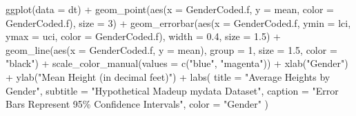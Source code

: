 \documentclass[
  letterpaper,
  DIV=11,
  numbers=noendperiod]{scrartcl}
\newenvironment{Shaded}{\begin{snugshade}}{\end{snugshade}}
\newcommand{\AttributeTok}[1]{\textcolor[rgb]{0.40,0.45,0.13}{#1}}
\newcommand{\DecValTok}[1]{\textcolor[rgb]{0.68,0.00,0.00}{#1}}
\newcommand{\FloatTok}[1]{\textcolor[rgb]{0.68,0.00,0.00}{#1}}
\newcommand{\FunctionTok}[1]{\textcolor[rgb]{0.28,0.35,0.67}{#1}}
\newcommand{\NormalTok}[1]{\textcolor[rgb]{0.00,0.23,0.31}{#1}}
\newcommand{\SpecialCharTok}[1]{\textcolor[rgb]{0.37,0.37,0.37}{#1}}
\newcommand{\StringTok}[1]{\textcolor[rgb]{0.13,0.47,0.30}{#1}}
\begin{document}
\begin{Shaded}
\begin{Highlighting}[]
\FunctionTok{ggplot}\NormalTok{(}\AttributeTok{data =}\NormalTok{ dt) }\SpecialCharTok{+}
  \FunctionTok{geom\_point}\NormalTok{(}\FunctionTok{aes}\NormalTok{(}\AttributeTok{x =}\NormalTok{ GenderCoded.f, }
                 \AttributeTok{y =}\NormalTok{ mean,}
                 \AttributeTok{color =}\NormalTok{ GenderCoded.f),}
             \AttributeTok{size =} \DecValTok{3}\NormalTok{) }\SpecialCharTok{+} 
  \FunctionTok{geom\_errorbar}\NormalTok{(}\FunctionTok{aes}\NormalTok{(}\AttributeTok{x =}\NormalTok{ GenderCoded.f, }
                    \AttributeTok{ymin =}\NormalTok{ lci, }
                    \AttributeTok{ymax =}\NormalTok{ uci,}
                    \AttributeTok{color =}\NormalTok{ GenderCoded.f), }
                \AttributeTok{width =} \FloatTok{0.4}\NormalTok{, }
                \AttributeTok{size =} \FloatTok{1.5}\NormalTok{) }\SpecialCharTok{+}
  \FunctionTok{geom\_line}\NormalTok{(}\FunctionTok{aes}\NormalTok{(}\AttributeTok{x =}\NormalTok{ GenderCoded.f, }
                \AttributeTok{y =}\NormalTok{ mean), }
            \AttributeTok{group =} \DecValTok{1}\NormalTok{,}
            \AttributeTok{size =} \FloatTok{1.5}\NormalTok{,}
            \AttributeTok{color =} \StringTok{"black"}\NormalTok{) }\SpecialCharTok{+}
  \FunctionTok{scale\_color\_manual}\NormalTok{(}\AttributeTok{values =} \FunctionTok{c}\NormalTok{(}\StringTok{"blue"}\NormalTok{, }
                               \StringTok{"magenta"}\NormalTok{)) }\SpecialCharTok{+} 
  \FunctionTok{xlab}\NormalTok{(}\StringTok{"Gender"}\NormalTok{) }\SpecialCharTok{+}
  \FunctionTok{ylab}\NormalTok{(}\StringTok{"Mean Height (in decimal feet)"}\NormalTok{) }\SpecialCharTok{+}
  \FunctionTok{labs}\NormalTok{(}
    \AttributeTok{title =} \StringTok{"Average Heights by Gender"}\NormalTok{,}
    \AttributeTok{subtitle =} \StringTok{"Hypothetical Madeup mydata Dataset"}\NormalTok{,}
    \AttributeTok{caption =} \StringTok{"Error Bars Represent 95\% Confidence Intervals"}\NormalTok{,}
    \AttributeTok{color =} \StringTok{"Gender"}
\NormalTok{  )}
\end{Highlighting}
\end{Shaded}
\end{document}
